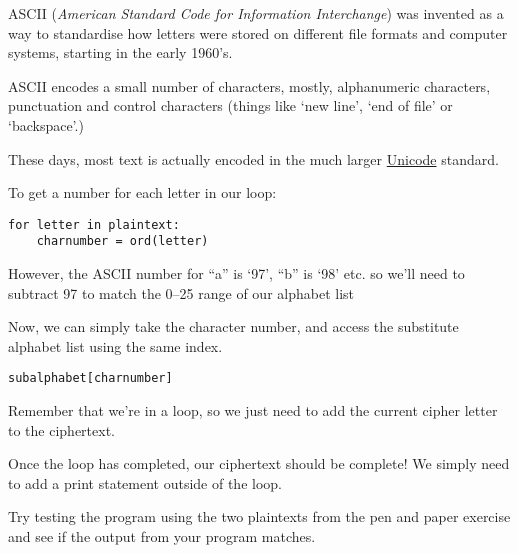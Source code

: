 		\begin{aside}[ASCII]
			ASCII (\textit{American Standard Code for Information Interchange}) was invented as a way to standardise how letters were stored on different file formats and computer systems, starting in the early 1960's.
			
			ASCII encodes a small number of characters, mostly, alphanumeric characters, punctuation and control characters (things like `new line', `end of file' or `backspace'.)
			
			These days, most text is actually encoded in the much larger \href{https://unicode.org/}{Unicode} standard.
		\end{aside}
		
		To get a number for each letter in our loop:
		
		\begin{lstlisting}[style=Python, firstnumber=9]
for letter in plaintext:
    charnumber = ord(letter)
		\end{lstlisting}
		
		However, the ASCII number for ``a'' is `97', ``b'' is `98' etc. so we'll need to subtract 97 to match the 0--25 range of our alphabet list 
		
		
		
		Now, we can simply take the character number, and access the substitute alphabet list using the same index.
		
		\begin{lstlisting}[style=Python, firstnumber=11]
    subalphabet[charnumber]
		\end{lstlisting}
		
		Remember that we're in a loop, so we just need to add the current cipher letter to the ciphertext.
		
		
		
		Once the loop has completed, our ciphertext should be complete! We simply need to add a print statement outside of the loop.
		
		
		
		Try testing the program using the two plaintexts from the pen and paper exercise and see if the output from your program matches.
		
